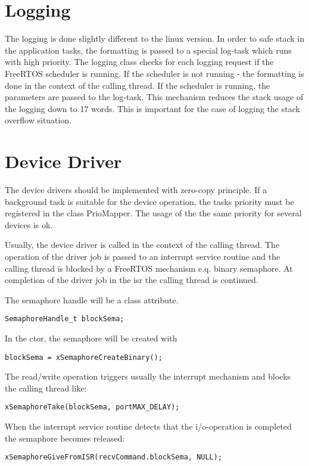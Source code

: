 \section{Logging}
The logging is done slightly different to the linux version.
In order to safe stack in the application tasks, the formatting is passed
to a special log-task which runs with high priority.
The logging class checks for each logging request if the FreeRTOS scheduler
is running. If the scheduler is not running - the formatting is done in the 
context of the calling thread. If the scheduler is running, the parameters
are passed to the log-task.
This mechanism reduces the stack usage of the logging down to 17 words. This
is important for the case of logging the stack overflow situation.

\section{Device Driver}
\label{sec_microcontroller_devicedriver}

The device drivers should be implemented with zero-copy principle.
If a background task is suitable for the device operation, the 
tasks priority must be registered in the class PrioMapper. The usage
of the the same priority for several devices is ok.

Usually, the device driver is called in the context of the calling thread.
The operation of the driver job is passed to an interrupt service routine and
the calling thread is blocked by a FreeRTOS mechanism e.q. binary semaphore.
At completion of the driver job in the isr the calling thread is continued.

The semaphore handle will be a class attribute.
\begin{verbatim}
SemaphoreHandle_t blockSema;
\end{verbatim}

 In the ctor,
the semaphore will be created with 
\begin{verbatim}
blockSema = xSemaphoreCreateBinary();
\end{verbatim}

The read/write operation triggers usually the interrupt mechanism and blocks
the calling thread like:
\begin{verbatim}
xSemaphoreTake(blockSema, portMAX_DELAY);
\end{verbatim}


When the interrupt service routine detects that the i/o-operation is completed
the semaphore becomes released:
\begin{verbatim}
xSemaphoreGiveFromISR(recvCommand.blockSema, NULL);
\end{verbatim}

